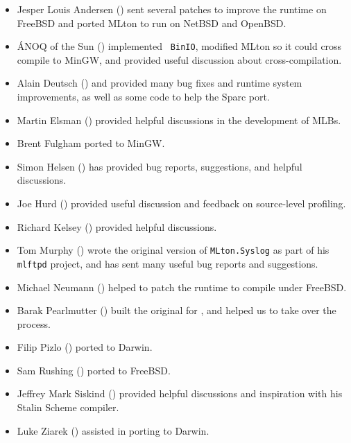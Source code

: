 \begin{itemize}

\item
Jesper Louis Andersen () sent several patches
to improve the runtime on FreeBSD and ported MLton to run on NetBSD
and OpenBSD.

\item
\'{A}NOQ of the Sun () implemented {\tt
BinIO}, modified MLton so it could cross compile to MinGW, and provided useful
discussion about cross-compilation.

\item
Alain Deutsch () and  provided many bug fixes and
runtime system improvements, as well as some code to help the Sparc
port.

\item
Martin Elsman () provided helpful discussions in the 
development of MLBs.

\item
Brent Fulgham ported {\mlton} to MinGW.

\item
Simon Helsen () has provided bug reports, suggestions,
and helpful discussions.

\item
Joe Hurd () provided useful discussion
and feedback on source-level profiling.

\item
Richard Kelsey () provided helpful
discussions.

\item
Tom Murphy () wrote the original version
of {\tt MLton.Syslog} as part of his {\tt mlftpd} project, and has
sent many useful bug reports and suggestions.

\item
Michael Neumann () helped to patch the runtime
to compile under FreeBSD.

\item
Barak Pearlmutter () built the original
for {\mlton}, and helped us to take over the process.

\item
Filip Pizlo () ported {\mlton} to
Darwin.

\item
Sam Rushing () ported {\mlton} to FreeBSD.

\item
Jeffrey Mark Siskind () provided helpful discussions
and inspiration with his Stalin Scheme compiler.

\item
Luke Ziarek () assisted in porting
{\mlton} to Darwin.

\end{itemize}
